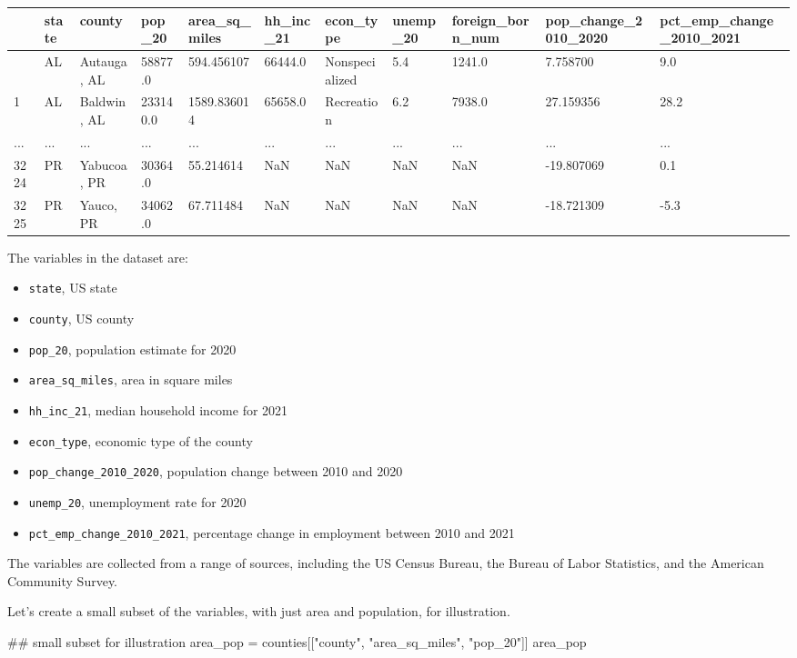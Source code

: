 \documentclass[
  letterpaper,
  DIV=11,
  numbers=noendperiod]{scrreprt}
\newenvironment{Shaded}{\begin{snugshade}}{\end{snugshade}}
\newcommand{\CommentTok}[1]{\textcolor[rgb]{0.37,0.37,0.37}{#1}}
\newcommand{\NormalTok}[1]{\textcolor[rgb]{0.00,0.23,0.31}{#1}}
\newcommand{\OperatorTok}[1]{\textcolor[rgb]{0.37,0.37,0.37}{#1}}
\newcommand{\StringTok}[1]{\textcolor[rgb]{0.13,0.47,0.30}{#1}}
\providecommand{\tightlist}{%
  \setlength{\itemsep}{0pt}\setlength{\parskip}{0pt}}\usepackage{longtable,booktabs,array}
\begin{document}
\begin{longtable}[]{@{}lllllllllll@{}}
\toprule\noalign{}
& state & county & pop\_20 & area\_sq\_miles & hh\_inc\_21 & econ\_type
& unemp\_20 & foreign\_born\_num & pop\_change\_2010\_2020 &
pct\_emp\_change\_2010\_2021 \\
\midrule\noalign{}
\endhead
\bottomrule\noalign{}
\endlastfoot
0 & AL & Autauga, AL & 58877.0 & 594.456107 & 66444.0 & Nonspecialized &
5.4 & 1241.0 & 7.758700 & 9.0 \\
1 & AL & Baldwin, AL & 233140.0 & 1589.836014 & 65658.0 & Recreation &
6.2 & 7938.0 & 27.159356 & 28.2 \\
... & ... & ... & ... & ... & ... & ... & ... & ... & ... & ... \\
3224 & PR & Yabucoa, PR & 30364.0 & 55.214614 & NaN & NaN & NaN & NaN &
-19.807069 & 0.1 \\
3225 & PR & Yauco, PR & 34062.0 & 67.711484 & NaN & NaN & NaN & NaN &
-18.721309 & -5.3 \\
\end{longtable}

The variables in the dataset are:

\begin{itemize}
\tightlist
\item
  \texttt{state}, US state
\item
  \texttt{county}, US county
\item
  \texttt{pop\_20}, population estimate for 2020
\item
  \texttt{area\_sq\_miles}, area in square miles
\item
  \texttt{hh\_inc\_21}, median household income for 2021
\item
  \texttt{econ\_type}, economic type of the county
\item
  \texttt{pop\_change\_2010\_2020}, population change between 2010 and
  2020
\item
  \texttt{unemp\_20}, unemployment rate for 2020
\item
  \texttt{pct\_emp\_change\_2010\_2021}, percentage change in employment
  between 2010 and 2021
\end{itemize}

The variables are collected from a range of sources, including the US
Census Bureau, the Bureau of Labor Statistics, and the American
Community Survey.

Let's create a small subset of the variables, with just area and
population, for illustration.

\begin{Shaded}
\begin{Highlighting}[]
\CommentTok{\#\# small subset for illustration}
\NormalTok{area\_pop }\OperatorTok{=}\NormalTok{ counties[[}\StringTok{"county"}\NormalTok{, }\StringTok{"area\_sq\_miles"}\NormalTok{, }\StringTok{"pop\_20"}\NormalTok{]]}
\NormalTok{area\_pop}
\end{Highlighting}
\end{Shaded}
\end{document}
